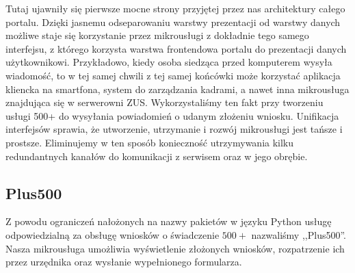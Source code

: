 \documentclass[licencjacka]{pracamgr}
\begin{document}
Tutaj ujawniły się pierwsze mocne strony przyjętej przez nas architektury całego
portalu. Dzięki jasnemu odseparowaniu warstwy prezentacji od warstwy danych
możliwe staje się korzystanie przez mikrousługi z dokładnie tego samego interfejsu,
z którego korzysta warstwa frontendowa portalu do prezentacji danych użytkownikowi.
Przykładowo, kiedy osoba siedząca przed komputerem wysyła wiadomość, to w tej samej
chwili z tej samej końcówki może korzystać aplikacja kliencka na smartfona, system
do zarządzania kadrami, a nawet inna mikrousługa znajdująca się w serwerowni ZUS.
Wykorzystaliśmy ten fakt przy tworzeniu usługi 500+ do wysyłania powiadomień o
udanym złożeniu wniosku.
Unifikacja interfejsów sprawia, że utworzenie, utrzymanie i rozwój mikrousługi jest
tańsze i prostsze. Eliminujemy w ten sposób konieczność utrzymywania kilku redundantnych
kanałów do komunikacji z serwisem oraz w jego obrębie.

\subsection{Plus500}

Z powodu ograniczeń nałożonych na nazwy pakietów w języku Python usługę odpowiedzialną
za obsługę wniosków o świadczenie $500+$ nazwaliśmy ,,Plus500''. Nasza mikrousługa
umożliwia wyświetlenie złożonych wniosków, rozpatrzenie ich przez urzędnika oraz
wysłanie wypełnionego formularza.
\end{document}
